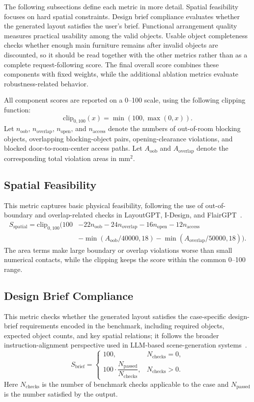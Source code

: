 The following subsections define each metric in more detail. Spatial feasibility focuses on hard spatial constraints. Design brief compliance evaluates whether the generated layout satisfies the user's brief. Functional arrangement quality measures practical usability among the valid objects. Usable object completeness checks whether enough main furniture remains after invalid objects are discounted, so it should be read together with the other metrics rather than as a complete request-following score. The final overall score combines these components with fixed weights, while the additional ablation metrics evaluate robustness-related behavior.

All component scores are reported on a 0--100 scale, using the following clipping function:
\[
\mathrm{clip}_{0,100}(x)=\min(100,\max(0,x)).
\]
Let \(n_{\mathrm{oob}}\), \(n_{\mathrm{overlap}}\), \(n_{\mathrm{open}}\), and \(n_{\mathrm{access}}\) denote the numbers of out-of-room blocking objects, overlapping blocking-object pairs, opening-clearance violations, and blocked door-to-room-center access paths. Let \(A_{\mathrm{oob}}\) and \(A_{\mathrm{overlap}}\) denote the corresponding total violation areas in \(\mathrm{mm}^{2}\).

\subsection{Spatial Feasibility}
This metric captures basic physical feasibility, following the use of out-of-boundary and overlap-related checks in LayoutGPT, I-Design, and FlairGPT~\cite{al2023LayoutgptCompositionalVisual,al2024IDesignPersonalized,Littlefair2025FlairgptRepurposingLlms}.
\[
\begin{aligned}
S_{\mathrm{spatial}}=\mathrm{clip}_{0,100}\bigl(
100
&-22n_{\mathrm{oob}}-24n_{\mathrm{overlap}}
-16n_{\mathrm{open}}-12n_{\mathrm{access}}\\
&-\min(A_{\mathrm{oob}}/40000,18)
-\min(A_{\mathrm{overlap}}/50000,18)
\bigr).
\end{aligned}
\]
The area terms make large boundary or overlap violations worse than small numerical contacts, while the clipping keeps the score within the common 0--100 range.

\subsection{Design Brief Compliance}
This metric checks whether the generated layout satisfies the case-specific design-brief requirements encoded in the benchmark, including required objects, expected object counts, and key spatial relations; it follows the broader instruction-alignment perspective used in LLM-based scene-generation systems~\cite{al2023LayoutgptCompositionalVisual,al2024IDesignPersonalized}.
\[
S_{\mathrm{brief}} =
\begin{cases}
100, & N_{\mathrm{checks}}=0,\\
100 \cdot \dfrac{N_{\mathrm{passed}}}{N_{\mathrm{checks}}}, & N_{\mathrm{checks}}>0.
\end{cases}
\]
Here \(N_{\mathrm{checks}}\) is the number of benchmark checks applicable to the case and \(N_{\mathrm{passed}}\) is the number satisfied by the output.

